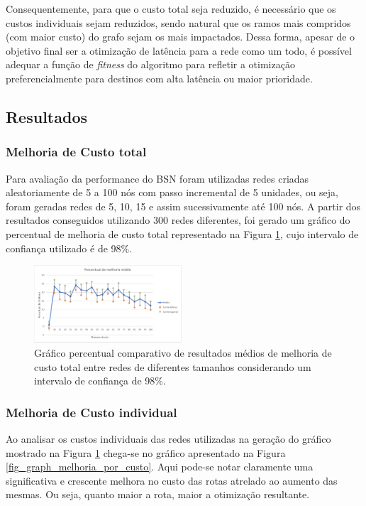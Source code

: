 \documentclass[conference]{IEEEtran}
\begin{document}
Consequentemente, para que o custo total seja reduzido, é necessário que os custos individuais sejam reduzidos, sendo natural que os ramos mais compridos (com maior custo) do grafo sejam os mais impactados. Dessa forma, apesar de o objetivo final ser a otimização de latência para a rede como um todo, é possível adequar a função de \emph{fitness} do algoritmo para refletir a otimização preferencialmente para destinos com alta latência ou maior prioridade.

\subsection{Resultados}

\subsubsection{Melhoria de Custo total}
Para avaliação da performance do BSN foram utilizadas redes criadas aleatoriamente de 5 a 100 nós com passo incremental de 5 unidades, ou seja, foram geradas redes de 5, 10, 15 e assim sucessivamente até 100 nós. A partir dos resultados conseguidos utilizando 300 redes diferentes, foi gerado um gráfico do percentual de melhoria de custo total representado na Figura \ref{fig_graph_bsn_medio_all}, cujo intervalo de confiança utilizado é de 98\%.

\begin{figure} [ht]%
	\centering
	\includegraphics[width=0.49\textwidth]{./figuras/BSN-resultados-medios-all2.png} %
	\caption[Melhoria de custo x tamanho de rede]{Gráfico percentual comparativo de resultados médios de melhoria de custo total entre redes de diferentes tamanhos considerando um intervalo de confiança de 98\%.}
	\label{fig_graph_bsn_medio_all}
\end{figure}

\subsubsection{Melhoria de Custo individual}
Ao analisar os custos individuais das redes utilizadas na geração do gráfico mostrado na Figura \ref{fig_graph_bsn_medio_all} chega-se no gráfico apresentado na Figura \ref{fig_graph_melhoria_por_custo}. Aqui pode-se notar claramente uma significativa e crescente melhora no custo das rotas atrelado ao aumento das mesmas. Ou seja, quanto maior a rota, maior a otimização resultante.
\end{document}
